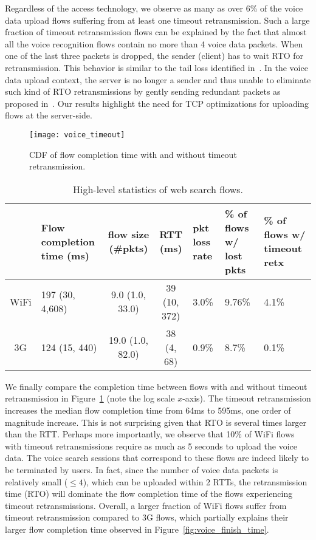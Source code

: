Regardless of the access technology, we observe as many as over 6\% of the voice data upload flows suffering from at least one timeout retransmission. Such a large fraction of timeout retransmission flows can be explained by the fact that almost all the voice recognition flows contain no more than 4 voice data packets. When one of the last three packets is dropped, the sender (\ie client) has to wait RTO for retransmission. This behavior is similar to the tail loss identified in~\cite{flach2013reducing}. In the voice data upload context, the server is no longer a sender and thus unable to eliminate such kind of RTO retransmissions by gently sending redundant packets as proposed in~\cite{flach2013reducing}. Our results highlight the need for TCP optimizations for uploading flows at the server-side. 

\begin{figure}[th]
\centering
	\texttt{[image: voice\_timeout]}
\caption{CDF of flow completion time with and without timeout retransmission.}
\label{fig:voice_rto}
\minsqueeze
\end{figure}

\begin{table*}[t]
\caption{High-level statistics of web search flows.}
\label{tab:web_stats}
\centering
\renewcommand{\arraystretch}{1.0}
\begin{tabular}{c|C{2.6cm}|c|c|C{1.2cm}|C{1.85cm}|C{2.1cm}}
	\hline
	& {Flow completion time (ms)} & {flow size (\#pkts)} & {RTT (ms)} & pkt loss rate & \% of flows w/ lost pkts & \% of flows w/ timeout retx \\
	\hline
	WiFi & 197 (30, 4,608) & 9.0 (1.0, 33.0) & 39 (10, 372) & 3.0\% & 9.76\% & 4.1\% \\
	\hline
	3G & 124 (15, 440) & 19.0 (1.0, 82.0) & 38 (4, 68) & 0.9\% & 8.7\% & 0.1\% \\
	\hline
\end{tabular}
\minsqueeze
\end{table*}

We finally compare the completion time between flows with and without timeout retransmission in Figure~\ref{fig:voice_rto} (note the log scale $x$-axis). The timeout retransmission increases the median flow completion time from 64ms to 595ms, \ie one order of magnitude increase. This is not surprising given that RTO is several times larger than the RTT. Perhaps more importantly, we observe that 10\% of WiFi flows with timeout retransmissions require as much as 5 seconds to upload the voice data. The voice search sessions that correspond to these flows are indeed likely to be terminated by users. In fact, since the number of voice data packets is relatively small ($\le 4$), which can be uploaded within 2 RTTs, the retransmission time (\ie RTO) will dominate the flow completion time of the flows experiencing timeout retransmissions.  Overall, a larger fraction of WiFi flows suffer from timeout retransmission compared to 3G flows, which partially explains their larger flow completion time observed in Figure~\ref{fig:voice_finish_time}.

